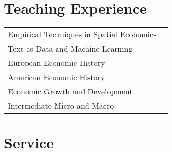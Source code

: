 \documentclass[11pt,fullpage]{article}
\begin{document}
\section*{Teaching Experience}

\begin{tabular}{ll}
	Empirical Techniques in Spatial Economics \\
	Text as Data and Machine Learning \\
	European Economic History  \\
	American Economic History  \\ 
	Economic Growth and Development \\
	Intermediate Micro and Macro \\
\end{tabular}


\section*{Service}
\end{document}
